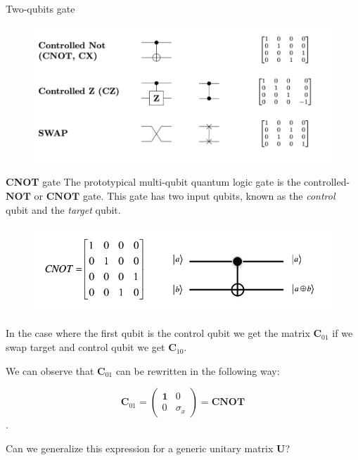 \documentclass[11p,aspectratio=169]{beamer}
\begin{document}
\begin{frame}{Two-qubits gate}
    \begin{figure}
        \includegraphics[width = \textwidth]{figures/two_qubits_gates.png}
    \end{figure}
\end{frame}   
\begin{frame}{\textbf{CNOT} gate}
    The prototypical multi-qubit quantum logic gate is the controlled-$\textbf{NOT}$ or $\textbf{CNOT}$ gate.
This gate has two input qubits, known as the \emph{control} qubit and the \emph{target} qubit.


    \begin{figure}
        \includegraphics[width=0.5 \textwidth]{figures/cnot.png}
    \end{figure}

    In the case where the first qubit is the control qubit we get the matrix $\textbf{C}_{01}$
    if we swap target and control qubit we get $\textbf{C}_{10}$.
    
    We can observe that $\textbf{C}_{01}$ can be rewritten in the following way:

    $$ \textbf{C}_{01} = \begin{pmatrix}
        \mathbf{1} & 0 \\
        0 & \sigma_x
    \end{pmatrix} = \textbf{CNOT}$$.

   Can we generalize this expression for a generic unitary matrix $\textbf{U}$?
\end{frame}
\end{document}
